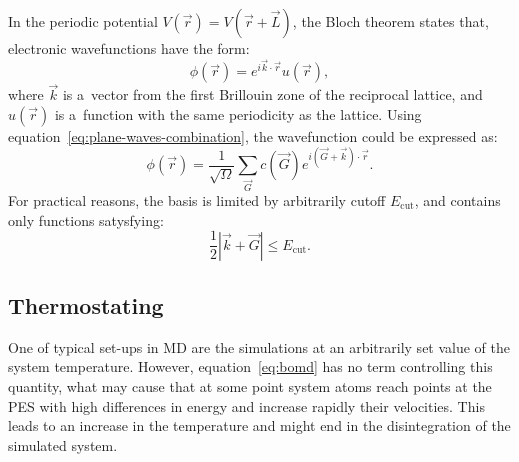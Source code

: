 In the periodic potential $V(\vec{r}) = V(\vec{r} + \vec{L})$, the Bloch theorem states that, electronic wavefunctions have the form:
\begin{equation}
    \phi(\vec{r}) = e^{i \vec{k} \cdot \vec{r}} u (\vec{r}),
\end{equation}
where $\vec{k}$ is a~vector from the first Brillouin zone of the reciprocal lattice, and $u(\vec{r})$ is a~function with the same periodicity as the lattice. Using equation~\ref{eq:plane-waves-combination}, the wavefunction could be expressed as:
\begin{equation}
    \phi(\vec{r}) = \frac{1}{\sqrt{\Omega}} \sum_{\vec{G}} c(\vec{G}) e^{i (\vec{G} + \vec{k}) \cdot \vec{r}}.
\end{equation}
For practical reasons, the basis is limited by arbitrarily cutoff $E_{\text{cut}}$, and contains only functions satysfying:
\begin{equation}
    \frac{1}{2} \left| \vec{k} + \vec{G} \right| \leq E_{\text{cut}}.
\end{equation}

\subsection{Thermostating}

One of typical set-ups in MD are the simulations at an arbitrarily set value of the system temperature. However, equation~\ref{eq:bomd} has no term controlling this quantity, what may cause that at some point system atoms reach points at the PES with high differences in energy and increase rapidly their velocities. This leads to an increase in the temperature and might end in the disintegration of the simulated system.

